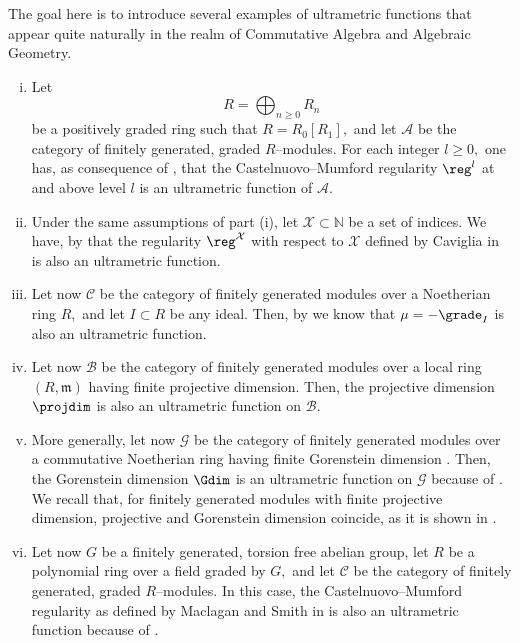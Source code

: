 \documentclass[11pt]{amsart}
\begin{document}
\begin{ex}
The goal here is to introduce several examples of ultrametric functions that appear quite naturally in the realm of Commutative Algebra and Algebraic Geometry.

\begin{enumerate}[(i)]

\item Let
\[
R=\bigoplus_{n\geq 0} R_n
\]
be a positively graded ring such that $R=R_0 [R_1],$ and let $\mathcal{A}$ be the category of finitely generated, graded $R$--modules. For each integer $l\geq 0,$ one has, as consequence of \cite[16.2.15 (ii)]{BroSha}, that the Castelnuovo--Mumford regularity $\reg^l$ at and above level $l$ is an ultrametric function of $\mathcal{A}.$

\item Under the same assumptions of part (i), let $\mathcal{X}\subset\mathbb{N}$ be a set of indices. We have, by \cite[Lemma 2.3 (i)]{Cavigliatensorproducts} that the regularity $\reg^{\mathcal{X}}$ with respect to $\mathcal{X}$ defined by Caviglia in \cite[Definition 2.1]{Cavigliatensorproducts} is also an ultrametric function.

\item Let now $\mathcal{C}$ be the category of finitely generated modules over a Noetherian ring $R,$ and let $I\subset R$ be any ideal. Then, by \cite[Proposition 1.2.9]{BrunsHerzog1993} we know that $\mu=-\grade_I$ is also an ultrametric function.

\item Let now $\mathcal{B}$ be the category of finitely generated modules over a local ring $(R,\mathfrak{m})$ having finite projective dimension. Then, the projective dimension $\projdim$ is also an ultrametric function on $\mathcal{B}.$

\item More generally, let now $\mathcal{G}$ be the category of finitely generated modules over a commutative Noetherian ring having finite Gorenstein dimension \cite[(1.2.3)]{Gdimensionbook}. Then, the Gorenstein dimension $\Gdim$ is an ultrametric function on $\mathcal{G}$ because of \cite[(1.2.9)]{Gdimensionbook}. We recall that, for finitely generated modules with finite projective dimension, projective and Gorenstein dimension coincide, as it is shown in \cite[(1.2.10)]{Gdimensionbook}.

\item Let now $G$ be a finitely generated, torsion free abelian group, let $R$ be a polynomial ring over a field graded by $G,$ and let $\mathcal{C}$ be the category of finitely generated, graded $R$--modules. In this case, the Castelnuovo--Mumford regularity as defined by Maclagan and Smith in \cite{MaclaganSmith2004} is also an ultrametric function because of \cite[Lemma 7.1]{MaclaganSmith2004}.


\end{enumerate}
\end{ex}
\end{document}
